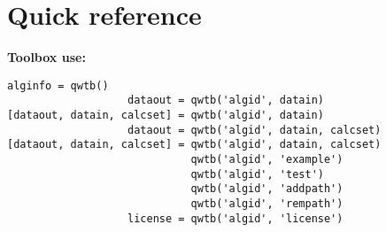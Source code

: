 \documentclass[12pt,a4paper,oneside]{report} %
\begin{document}
\appendix \chapter{Quick reference} %
\newpage
{\small \textbf{Toolbox use:}\\[-1.5em]
\begin{lstlisting}[basicstyle=\small]
                   alginfo = qwtb()
                   dataout = qwtb('algid', datain)
[dataout, datain, calcset] = qwtb('algid', datain)
                   dataout = qwtb('algid', datain, calcset)
[dataout, datain, calcset] = qwtb('algid', datain, calcset)
                             qwtb('algid', 'example')
                             qwtb('algid', 'test')
                             qwtb('algid', 'addpath')
                             qwtb('algid', 'rempath')
                   license = qwtb('algid', 'license')
\end{lstlisting}

}
\end{document}
